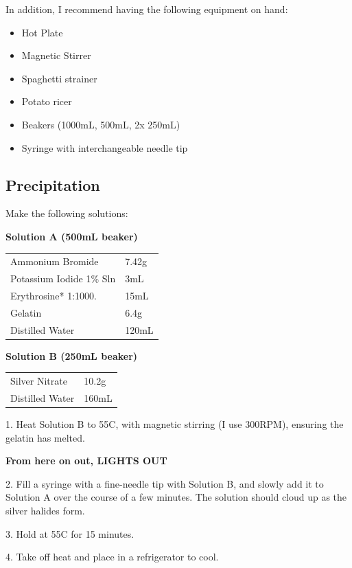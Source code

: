 \documentclass[11pt]{article}
\begin{document}
In addition, I recommend having the following equipment on hand:
\begin{itemize}
	\item Hot Plate
	\item Magnetic Stirrer
	\item Spaghetti strainer
	\item Potato ricer
	\item Beakers (1000mL, 500mL, 2x 250mL)
	\item Syringe with interchangeable needle tip
\end{itemize}

\subsection{Precipitation}

Make the following solutions:\newline

\textbf{Solution A (500mL beaker)}

\begin{tabular}{ll}
	Ammonium Bromide & 7.42g \\
	Potassium Iodide 1\% Sln & 3mL \\
	Erythrosine* 1:1000. & 15mL \\
	Gelatin & 6.4g \\
	Distilled Water & 120mL \\
\end{tabular}\newline

\textbf{Solution B (250mL beaker)}

\begin{tabular}{ll}
	Silver Nitrate & 10.2g \\
	Distilled Water & 160mL \\
\end{tabular}\newline

1. Heat Solution B to 55C, with magnetic stirring (I use 300RPM), ensuring the gelatin has melted.

\textbf{From here on out, LIGHTS OUT}

2. Fill a syringe with a fine-needle tip with Solution B, and slowly add it to Solution A over the course of a few minutes. The solution should cloud up as the silver halides form.

3. Hold at 55C for 15 minutes.

4. Take off heat and place in a refrigerator to cool.
\end{document}
